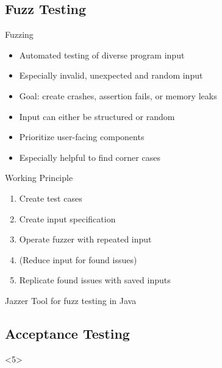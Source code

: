 \subsection{Fuzz Testing}
\begin{frame}{\insertsubsection}
	\begin{fancycolumns}[animation=none]
		\begin{definition}{Fuzzing}
			\begin{itemize}
				\item Automated testing of diverse program input
				\item Especially invalid, unexpected and random input
				\item Goal: create crashes, assertion fails, or memory leaks
				\item Input can either be structured or random
				\item Prioritize user-facing components
				\item Especially helpful to find corner cases
			\end{itemize}
		\end{definition}\pause
		\begin{note}{Working Principle}
			\begin{enumerate}
				\item Create test cases
				\item Create input specification
				\item Operate fuzzer with repeated input
				\item (Reduce input for found issues)
				\item Replicate found issues with saved inputs
			\end{enumerate}
		\end{note} \pause
		\nextcolumn
		 \pause
		\begin{note}{Jazzer} %
			Tool for fuzz testing in Java
		\end{note}
	\end{fancycolumns}
\end{frame}

\subsection{Acceptance Testing}
\begin{frame}<5>{\insertsubsection}
	\slideStagesTesting
\end{frame}

